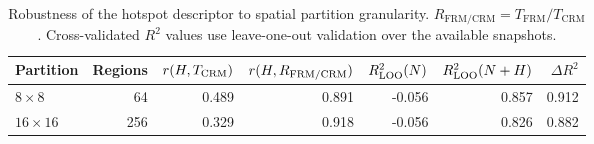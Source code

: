 \begin{table}[t]
\centering
\caption{Robustness of the hotspot descriptor to spatial partition granularity. 
$R_{\mathrm{FRM/CRM}}=T_{\mathrm{FRM}}/T_{\mathrm{CRM}}$. 
Cross-validated $R^2$ values use leave-one-out validation over the available snapshots.}
\label{tab:granularity-robustness}
\begin{tabular}{lrrrrrr}
\hline
Partition & Regions & $r(H,T_{\rm CRM})$ & $r(H,R_{\rm FRM/CRM})$ &
$R^2_{\rm LOO}(N)$ & $R^2_{\rm LOO}(N+H)$ & $\Delta R^2$ \\
\hline
$8\times8$ & 64 & 0.489 & 0.891 & -0.056 & 0.857 & 0.912 \\
$16\times16$ & 256 & 0.329 & 0.918 & -0.056 & 0.826 & 0.882 \\
\hline
\end{tabular}
\end{table}

